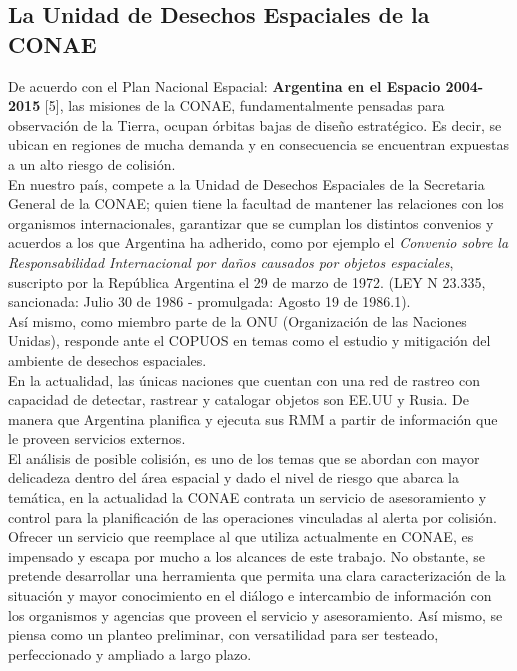 \subsection*{La Unidad de Desechos Espaciales de la CONAE}
De acuerdo con el Plan Nacional Espacial: {\bf{ Argentina en el Espacio 2004-2015}} [5], las misiones de la CONAE, fundamentalmente pensadas para observaci\'on de la Tierra, ocupan \'orbitas bajas de dise\~no estrat\'egico. Es decir, se ubican en regiones de mucha demanda y en consecuencia se encuentran expuestas a un alto riesgo de colisi\'on.\\
En nuestro pa\'is, compete a la Unidad de Desechos Espaciales de la Secretaria General de la CONAE; quien tiene la facultad de mantener las relaciones con los organismos internacionales, garantizar que se cumplan los distintos convenios y acuerdos a los que Argentina ha adherido, como por ejemplo el {\it{Convenio sobre la Responsabilidad Internacional por da\~nos causados por objetos espaciales}}, suscripto por la Rep\'ublica Argentina el 29 de marzo de 1972. (LEY N 23.335, sancionada: Julio 30 de 1986 - promulgada: Agosto 19 de 1986.1).\\
 As\'i mismo, como miembro parte de la ONU (Organizaci\'on de las Naciones Unidas), responde ante el \ac{COPUOS} en temas como el estudio y mitigaci\'on del ambiente de desechos espaciales.\\

	En la actualidad, las \'unicas naciones que cuentan con una red de rastreo con capacidad de detectar, rastrear y catalogar objetos son EE.UU y Rusia. De manera que Argentina planifica y ejecuta sus RMM a partir de informaci\'on que le proveen servicios externos.\\

El an\'alisis de posible colisi\'on, es uno de los temas que se abordan con mayor delicadeza dentro del \'area espacial y dado el nivel de riesgo que abarca la tem\'atica, en la actualidad la CONAE contrata un servicio de asesoramiento y control para la planificaci\'on de las operaciones vinculadas al alerta por colisi\'on.\\
Ofrecer un servicio que reemplace al que utiliza actualmente en CONAE, es impensado y escapa por mucho a los alcances de este trabajo. No obstante, se pretende desarrollar una herramienta que permita una clara caracterizaci\'on de la situaci\'on y mayor conocimiento en el di\'alogo e intercambio de informaci\'on con los organismos y agencias que proveen el servicio y asesoramiento. As\'i mismo, se piensa como un planteo preliminar, con versatilidad para ser testeado, perfeccionado y ampliado a largo plazo.\\




